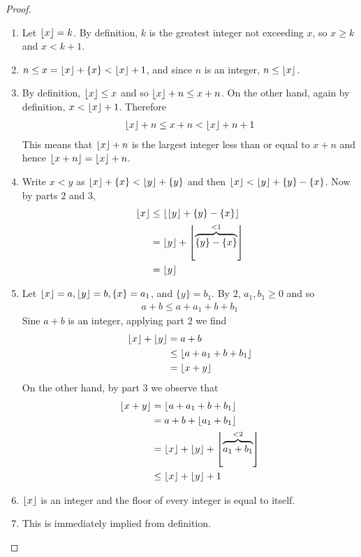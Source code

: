 \begin{proof}
\begin{enumerate}[1.]
	\item Let $\left\lfloor{x}\right\rfloor=k$. By definition, $k$ is the greatest integer not exceeding $x$, so $x \geq k$ and $x<k+1$.
	\item $n \leq x = \left\lfloor{x}\right\rfloor + \{x\} <\left\lfloor{x}\right\rfloor +1$, and since $n$ is an integer, $n \leq \left\lfloor{x}\right\rfloor$.
	\item By definition, $\left\lfloor{x}\right\rfloor \leq x$ and so $\left\lfloor{x}\right\rfloor+n \leq x+n$. On the other hand, again by definition, $x < \left\lfloor{x}\right\rfloor+1$. Therefore
	\begin{align*}
		\left\lfloor{x}\right\rfloor +n \leq x+n < \left\lfloor{x}\right\rfloor+ n+ 1
	\end{align*}
	This means that $\left\lfloor{x}\right\rfloor +n$ is the largest integer less than or equal to $x+n$ and hence $\left\lfloor{x+n}\right\rfloor=\left\lfloor{x}\right\rfloor+n$.
	\item Write $x<y$ as $\left\lfloor{x}\right\rfloor + \{x\} < \left\lfloor{y}\right\rfloor + \{y\}$ and then $\left\lfloor{x}\right\rfloor< \left\lfloor{y}\right\rfloor +\{y\}-\{x\}$. Now by parts $2$ and $3$,
	\begin{align*}
		\left\lfloor{x}\right\rfloor &\leq \left\lfloor{\left\lfloor{y}\right\rfloor +\{y\}-\{x\}}\right\rfloor\\
		&= \left\lfloor{y}\right\rfloor+ \left\lfloor{\overbrace{\{y\}-\{x\}}^{<1}}\right\rfloor\\
		&= \left\lfloor{y}\right\rfloor
	\end{align*}
	\item Let $	\left\lfloor{x}\right\rfloor=a, \left\lfloor{y}\right\rfloor=b, \{x\}=a_1$, and $\{y\}=b_1$. By $2$, $a_1, b_1 \geq 0$ and so
	\begin{align*}
		a+b \leq a+a_1+b+b_1
	\end{align*}
	Sine $a+b$ is an integer, applying part $2$ we find
	\begin{align*}
		\left\lfloor{x}\right\rfloor+ \left\lfloor{y}\right\rfloor&= a+b \\
		&\leq \left\lfloor{a+a_1+b+b_1}\right\rfloor\\
		&= \left\lfloor{x+y}\right\rfloor
	\end{align*}
	On the other hand, by part $3$ we observe that
	\begin{align*}
		\left\lfloor{x+y}\right\rfloor&= \left\lfloor{a+a_1+b+b_1}\right\rfloor\\
		&= a + b + \left\lfloor{a_1+b_1}\right\rfloor\\
		&= \left\lfloor{x}\right\rfloor+ \left\lfloor{y}\right\rfloor+ \left\lfloor{\overbrace{a_1+b_1}^{<2}}\right\rfloor\\
		&\leq \left\lfloor{x}\right\rfloor+ \left\lfloor{y}\right\rfloor+ 1
	\end{align*}

	\item $\left\lfloor{x}\right\rfloor$ is an integer and the floor of every integer is equal to itself.
	\item This is immediately implied from definition.
\end{enumerate}
\end{proof}

